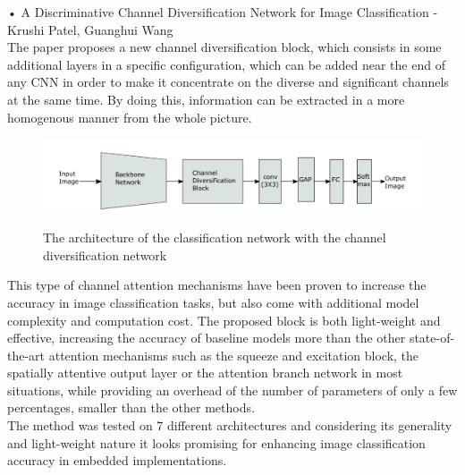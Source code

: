 \documentclass[11pt, a4paper, oneside, pdftex]{research_paper}
\begin{document}
\hspace{20mm}•\hspace{3mm}	A Discriminative Channel Diversification Network for Image Classification - Krushi Patel, Guanghui Wang \\
\null \hspace{30mm}	The paper proposes a new channel diversification block, which consists in some additional layers in a specific configuration,  which can be added near the end of any CNN in order to make it concentrate on the diverse and significant channels at the same time. By doing this, information can be extracted in a more homogenous manner from the whole picture. \\
\goodbreak
\begin{figure}[!h]
    \centering
    \includegraphics[width=0.9\linewidth]{figures/image_1}
    \caption{The architecture of the classification network with the channel diversification network}
    \label{fig:figure1}\cite{1}
\end{figure}
\null \hspace{30mm}	This type of channel attention mechanisms have been proven to increase the accuracy in image classification tasks, but also come with additional model complexity and computation cost. The proposed block is both light-weight and effective, increasing the accuracy of baseline models more than the other state-of-the-art attention mechanisms such as the squeeze and excitation block, the spatially attentive output layer or the attention branch network in most situations, while providing an overhead of the number of parameters of only a few percentages, smaller than the other methods. \\
\null \hspace{30mm}	The method was tested on 7 different architectures and considering its generality and light-weight nature it looks promising for enhancing image classification accuracy in embedded implementations. \\
\end{document}

